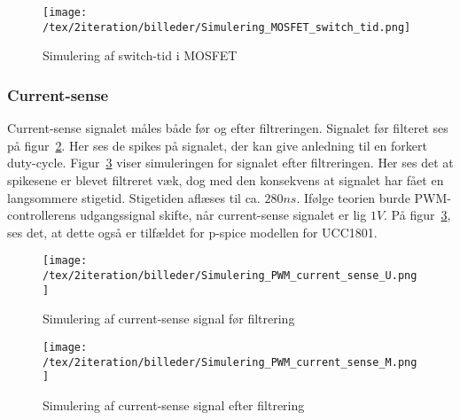 \begin{figure}[H]
	\center
	\texttt{[image: /tex/2iteration/billeder/Simulering\_MOSFET\_switch\_tid.png]}
	\caption{Simulering af switch-tid i MOSFET}
	\label{fig:Simulering_MOSFET_switch_tid}
\end{figure}


\subsubsection{Current-sense}
Current-sense signalet måles både før og efter filtreringen. Signalet før filteret ses på figur~\ref{fig:Simulering_PWM_current_sense_U}. Her ses de spikes på signalet, der kan give anledning til en forkert duty-cycle. Figur~\ref{fig:Simulering_PWM_current_sense_M} viser simuleringen for signalet efter filtreringen. Her ses det at spikesene er blevet filtreret væk, dog med den konsekvens at signalet har fået en langsommere stigetid. Stigetiden aflæses til ca. $280ns$. Ifølge teorien burde PWM-controllerens udgangssignal skifte, når current-sense signalet er lig $1V$. På figur~\ref{fig:Simulering_PWM_current_sense_M}, ses det, at dette også er tilfældet for p-spice modellen for UCC1801. 


\begin{figure}[H]
	\center
	\texttt{[image: /tex/2iteration/billeder/Simulering\_PWM\_current\_sense\_U.png]}
	\caption{Simulering af current-sense signal før filtrering}
	\label{fig:Simulering_PWM_current_sense_U}
\end{figure}

\begin{figure}[H]
	\center
	\texttt{[image: /tex/2iteration/billeder/Simulering\_PWM\_current\_sense\_M.png]}
	\caption{Simulering af current-sense signal efter filtrering}
	\label{fig:Simulering_PWM_current_sense_M}
\end{figure}


